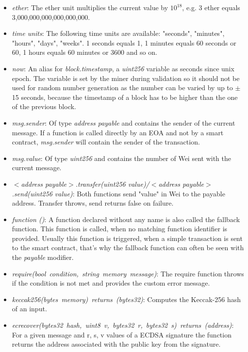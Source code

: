 \begin{itemize}
  \item \textit{ether}: The ether unit multiplies the current value by \(10^{18}\), e.g. 3 ether equals 3,000,000,000,000,000,000.
  \item \textit{time units}: The following time units are available: "seconds", "minutes", "hours", "days", "weeks". 1 seconds equals 1, 1 minutes equals 60 seconds or 60, 1 hours equals 60 minutes or 3600 and so on.
  \item \textit{now}: An alias for \textit{block.timestamp}, a \textit{uint256} variable as seconds since unix epoch. The variable is set by the miner during validation so it should not be used for random number generation as the number can be varied by up to $\pm$ 15 seconds, because the timestamp of a block has to be higher than the one of the previous block.
  \item \textit{msg.sender}: Of type \textit{address payable} and contains the sender of the current message. If a function is called directly by an EOA and not by a smart contract, \textit{msg.sender} will contain the sender of the transaction.
  \item \textit{msg.value}: Of type \textit{uint256} and contains the number of Wei sent with the current message.
  \item \textit{$<$address payable$>$.transfer(uint256 value)/$<$address payable$>$.send(uint256 value)}: Both functions send "value" in Wei to the payable address. Transfer throws, send returns false on failure.
  \item \textit{function ()}: A function declared without any name is also called the fallback function. This function is called, when no matching function identifier is provided. Usually this function is triggered, when a simple transaction is sent to the smart contract, that's why the fallback function can often be seen with the \textit{payable} modifier.
  \item \textit{require(bool condition, string memory message)}: The require function throws if the condition is not met and provides the custom error message.
  \item \textit{keccak256(bytes memory) returns (bytes32)}: Computes the Keccak-256 hash of an input.
  \item \textit{ecrecover(bytes32 hash, uint8 v, bytes32 r, bytes32 s) returns (address)}: For a given message and r, s, v values of a ECDSA signature the function returns the address associated with the public key from the signature.
\end{itemize}
